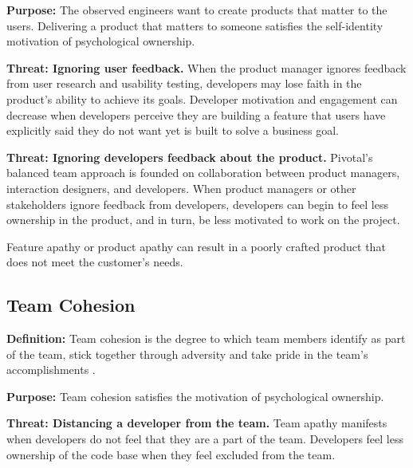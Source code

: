 \textbf{Purpose:} The observed engineers want to create products that matter to the users. Delivering a product that matters to someone satisfies the self-identity motivation of psychological ownership.

\textbf{Threat: Ignoring user feedback.} When the product manager ignores feedback from user research and usability testing, developers may lose faith in the product's ability to achieve its goals. Developer motivation and engagement can decrease when developers perceive they are building a feature that users have explicitly said they do not want yet is built to solve a business goal. 

\textbf{Threat: Ignoring developers feedback about the product.} Pivotal's balanced team approach is founded on collaboration between product managers, interaction designers, and developers. When product managers or other stakeholders ignore feedback from developers, developers can begin to feel less ownership in the product, and in turn, be less motivated to work on the project. 


Feature apathy or product apathy can result in a poorly crafted product that does not meet the customer's needs.

\subsection{Team Cohesion}
\textbf{Definition:} Team cohesion is the degree to which team members identify as part of the team, stick together through adversity and take pride in the team's accomplishments \cite{Bollen1990Perceived, Beal2003Cohesion, Whitworth2007Motivation}.

\textbf{Purpose:} Team cohesion satisfies the  motivation of psychological ownership.

\textbf{Threat: Distancing a developer from the team.} Team apathy manifests when developers do not feel that they are a part of the team. Developers feel less ownership of the code base when they feel excluded from the team.

